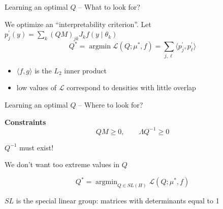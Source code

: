 \documentclass[10.5pt, aspectratio=169]{beamer} %
\DeclareMathOperator*{\argmin}{argmin}
\begin{document}
\begin{frame}{Learning an optimal $Q$ -- What to look for?}

We optimize an ``interpretability criterion''. Let $p^\prime_j(y) =  \sum_{k} (QM)_{ jk} J_k f(y \mid \theta_k)$
\[
	Q^* = \argmin \mathcal L(Q; \mu^*, f) = \sum_{j, \ell} \langle  p^\prime_j,  p^\prime_\ell \rangle
\]


\begin{itemize}
	\item $\langle f, g \rangle$ is the $L_2$ inner product
	\item low values of $\mathcal L$ correspond to densities with little overlap
\end{itemize}
\end{frame}


\begin{frame}{Learning an optimal $Q$ -- Where to look for?}

\textbf{Constraints}
\[
	QM \geq 0, \qquad \Lambda Q^{-1} \geq 0
\]

\pause

\medskip

$Q^{-1}$ must exist!

\pause 

\medskip

We don't want too extreme values in $Q$

\pause

\[
	Q^* = \argmin_{Q \in SL(H)} \mathcal L(Q; \mu^*, f) 
\]

$SL$ is the special linear group: matrices with determinants equal to 1

\end{frame}
\end{document}
